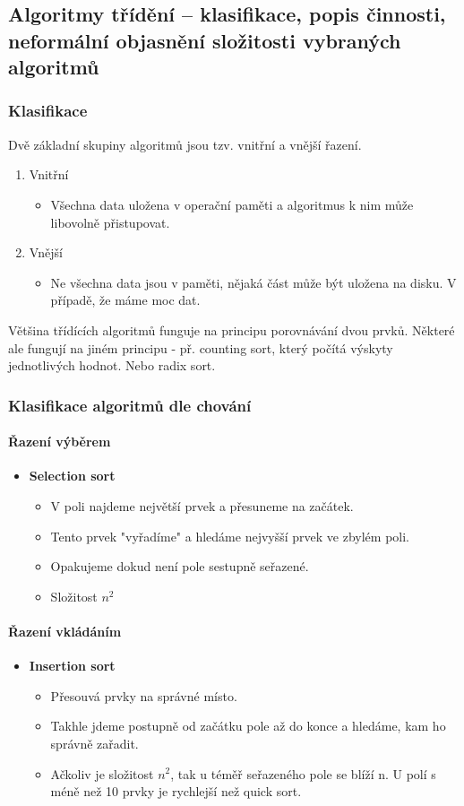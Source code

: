 \documentclass[10pt,a4paper]{article}
\begin{document}
\subsection{Algoritmy třídění – klasifikace, popis činnosti, neformální objasnění složitosti vybraných algoritmů}
\subsubsection{Klasifikace}
Dvě základní skupiny algoritmů jsou tzv. vnitřní a vnější řazení.
\begin{enumerate}
    \item Vnitřní
    \begin{itemize}
        \item Všechna data uložena v operační paměti a algoritmus k nim může libovolně přistupovat.
    \end{itemize}
    \item Vnější
    \begin{itemize}
        \item Ne všechna data jsou v paměti, nějaká část může být uložena na disku. V případě, že máme moc dat.
    \end{itemize}
\end{enumerate}
Většina třídících algoritmů funguje na principu porovnávání dvou prvků. Některé ale fungují na jiném principu - př. counting sort, který počítá výskyty jednotlivých hodnot. Nebo radix sort.
\subsubsection{Klasifikace algoritmů dle chování}
\paragraph{Řazení výběrem}
\begin{itemize}
\item \textbf{Selection sort}
\begin{itemize}
\item V poli najdeme největší prvek a přesuneme na začátek.
\item Tento prvek "vyřadíme" a hledáme nejvyšší prvek ve zbylém poli.
\item Opakujeme dokud není pole sestupně seřazené.
\item Složitost $n^2$
\end{itemize}
\end{itemize}
\paragraph{Řazení vkládáním}
\begin{itemize}
\item \textbf{Insertion sort}
\begin{itemize}
\item Přesouvá prvky na správné místo.
\item Takhle jdeme postupně od začátku pole až do konce a hledáme, kam ho správně zařadit.
\item Ačkoliv je složitost $n^2$, tak u téměř seřazeného pole se blíží n. U polí s méně než 10 prvky je rychlejší než quick sort.
\end{itemize}
\end{itemize}
\end{document}
